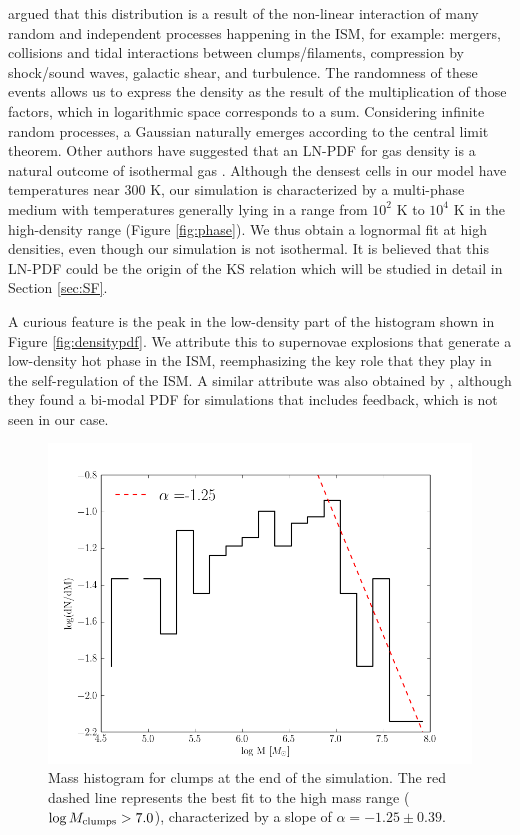\documentclass[twocolumn]{aastex}
\begin{document}
\citet{Wada_07} argued that this distribution is a result of the non-linear interaction of many random and independent processes happening in the ISM, for example: mergers, collisions and tidal interactions between clumps/filaments, compression by shock/sound waves, galactic shear, and turbulence. The randomness of these events allows us to express the density as the result of the multiplication of those factors, which in logarithmic space corresponds to a sum. Considering infinite random processes, a Gaussian naturally emerges according to the central limit theorem. Other authors have suggested that an LN-PDF for gas density is a natural outcome of isothermal gas \citep[e.g.,][]{Passot_98, Vazquez_Semadeni_00}. Although the densest cells in our model have temperatures near 300 K, our simulation is characterized by a multi-phase medium with temperatures generally lying in a range from $10^2$ K to $10^4$ K in the high-density range (Figure \ref{fig:phase}). We thus obtain a lognormal fit at high densities, even though our simulation is not isothermal. It is believed that this LN-PDF could be the origin of the KS relation \citep{Elmegreen_02, Wada_07} which will be studied in detail in Section \ref{sec:SF}.

A curious feature is the peak in the low-density part of the histogram shown in Figure \ref{fig:densitypdf}. We attribute this to supernovae explosions that generate a low-density hot phase in the ISM, reemphasizing the key role that they play in the self-regulation of the ISM. A similar attribute was also obtained by \citet{Slyz_05}, although they found a bi-modal PDF for simulations that includes feedback, which is not seen in our case.

	\begin{figure}[h!]
	\begin{center}
	\includegraphics[scale=0.5]{./f5.png}
	\caption{Mass histogram for clumps at the end of the simulation. The red dashed line represents the best fit to the high mass range ($\log{M_{\rm clumps}} > 7.0$), characterized by a slope of $\alpha = -1.25 \pm 0.39$.}
	\label{fig:clumpspdf}
	\end{center}
	\end{figure}
\end{document}
